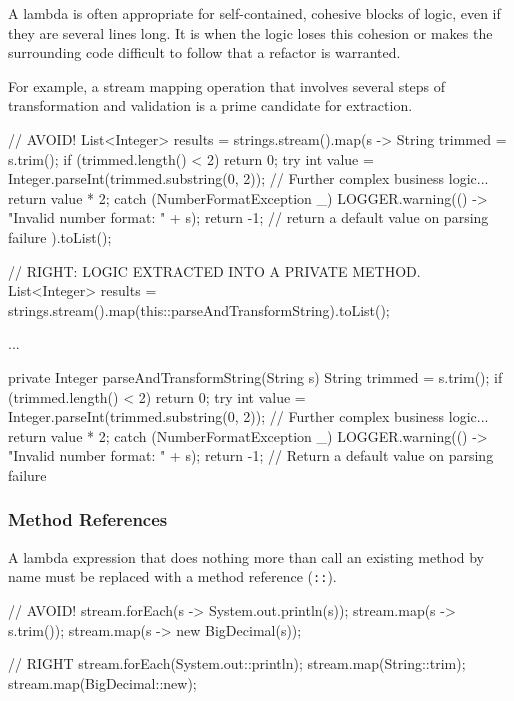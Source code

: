 \documentclass{article}
\begin{document}
A lambda is often appropriate for self-contained, cohesive blocks of logic, even if they are several
lines long. It is when the logic loses this cohesion or makes the surrounding code difficult to
follow that a refactor is warranted.

For example, a stream mapping operation that involves several steps of transformation and validation
is a prime candidate for extraction.

\begin{snippet}
// AVOID!
List<Integer> results = strings.stream().map(s -> {
    String trimmed = s.trim();
    if (trimmed.length() < 2) {
        return 0;
    }
    try {
        int value = Integer.parseInt(trimmed.substring(0, 2));
        // Further complex business logic...
        return value * 2;
    } catch (NumberFormatException _) {
        LOGGER.warning(() -> "Invalid number format: " + s);
        return -1; // return a default value on parsing failure
    }
}).toList();


// RIGHT: LOGIC EXTRACTED INTO A PRIVATE METHOD.
List<Integer> results = strings.stream().map(this::parseAndTransformString).toList();

...

private Integer parseAndTransformString(String s) {
    String trimmed = s.trim();
    if (trimmed.length() < 2) {
        return 0;
    }
    try {
        int value = Integer.parseInt(trimmed.substring(0, 2));
        // Further complex business logic...
        return value * 2;
    } catch (NumberFormatException _) {
        LOGGER.warning(() -> "Invalid number format: " + s);
        return -1; // Return a default value on parsing failure
    }
}
\end{snippet}

\subsubsection{Method References}

A lambda expression that does nothing more than call an existing method by name must be replaced
with a method reference (\texttt{::}).

\begin{snippet}
// AVOID!
stream.forEach(s -> System.out.println(s));
stream.map(s -> s.trim());
stream.map(s -> new BigDecimal(s));

// RIGHT
stream.forEach(System.out::println);
stream.map(String::trim);
stream.map(BigDecimal::new);
\end{snippet}
\end{document}

